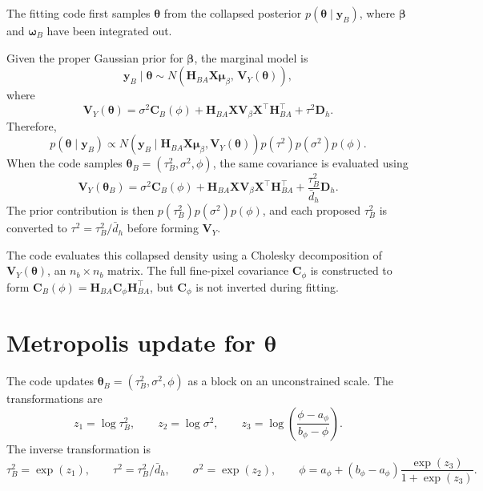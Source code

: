 \documentclass[11pt]{article}
\newcommand{\bsy}{\bm{y}}
\newcommand{\bsb}{\bm{\beta}}
\newcommand{\bsw}{\bm{\omega}}
\newcommand{\bstheta}{\bm{\theta}}
\begin{document}
The fitting code first samples $\bstheta$ from the collapsed posterior $p(\bstheta\mid \bsy_B)$, where $\bsb$ and $\bsw_B$ have been integrated out.

Given the proper Gaussian prior for $\bsb$, the marginal model is
\begin{equation}
\bsy_B \mid \bstheta
\sim
N\left(
\bm{H}_{BA}\bm{X}\bm{\mu}_{\beta},\,
\bm{V}_Y(\bstheta)
\right),
\label{eq:yB_marginal}
\end{equation}
where
\begin{equation}
\bm{V}_Y(\bstheta)
=
\sigma^2\bm{C}_B(\phi)
+
\bm{H}_{BA}\bm{X}\bm{V}_{\beta}\bm{X}^{\top}\bm{H}_{BA}^{\top}
+
\tau^2\bm{D}_h.
\label{eq:VY}
\end{equation}
Therefore,
\begin{equation}
p(\bstheta\mid \bsy_B)
\propto
N\left(
\bsy_B \mid
\bm{H}_{BA}\bm{X}\bm{\mu}_{\beta},
\bm{V}_Y(\bstheta)
\right)
p(\tau^2)p(\sigma^2)p(\phi).
\label{eq:theta_collapsed}
\end{equation}
When the code samples $\bstheta_B=(\tau_B^2,\sigma^2,\phi)$, the same covariance is evaluated using
$$
\bm{V}_Y(\bstheta_B)
=
\sigma^2\bm{C}_B(\phi)
+
\bm{H}_{BA}\bm{X}\bm{V}_{\beta}\bm{X}^{\top}\bm{H}_{BA}^{\top}
+
\frac{\tau_B^2}{\bar{d}_h}\bm{D}_h.
$$
The prior contribution is then $p(\tau_B^2)p(\sigma^2)p(\phi)$, and each proposed $\tau_B^2$ is converted to $\tau^2=\tau_B^2/\bar{d}_h$ before forming $\bm{V}_Y$.

The code evaluates this collapsed density using a Cholesky decomposition of $\bm{V}_Y(\bstheta)$, an $n_b\times n_b$ matrix. The full fine-pixel covariance $\bm{C}_{\phi}$ is constructed to form $\bm{C}_B(\phi)=\bm{H}_{BA}\bm{C}_{\phi}\bm{H}_{BA}^{\top}$, but $\bm{C}_{\phi}$ is not inverted during fitting.

\section{Metropolis update for $\bstheta$}

The code updates $\bstheta_B=(\tau_B^2,\sigma^2,\phi)$ as a block on an unconstrained scale. The transformations are
\begin{equation}
z_1 = \log \tau_B^2,
\qquad
z_2 = \log \sigma^2,
\qquad
z_3
=
\log\left(\frac{\phi-a_{\phi}}{b_{\phi}-\phi}\right).
\label{eq:z_transform}
\end{equation}
The inverse transformation is
\begin{equation}
\tau_B^2 = \exp(z_1),
\qquad
\tau^2 = \tau_B^2/\bar{d}_h,
\qquad
\sigma^2 = \exp(z_2),
\qquad
\phi
=
a_{\phi}
+
(b_{\phi}-a_{\phi})
\frac{\exp(z_3)}{1+\exp(z_3)}.
\label{eq:z_inverse}
\end{equation}
\end{document}
